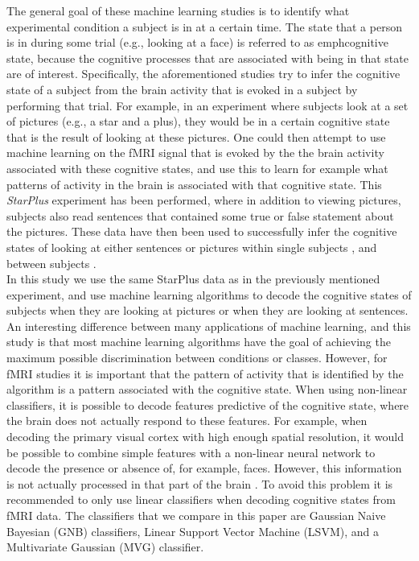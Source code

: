 \documentclass[preprint,journal,11pt]{vgtc}
\begin{document}
\indent  The general goal of these machine learning studies is to identify what experimental condition a subject is in at a certain time. The state that a person is in during some trial (e.g., looking at a face) is referred to as emph{cognitive state}, because the cognitive processes that are associated with being in that state are of interest. Specifically, the aforementioned studies try to infer the cognitive state of a subject from the brain activity that is evoked in a subject by performing that trial. For example, in an experiment where subjects look at a set of pictures (e.g., a star and a plus), they would be in a certain cognitive state that is the result of looking at these pictures. One could then attempt to use machine learning on the fMRI signal that is evoked by the the brain activity associated with these cognitive states, and use this to learn for example what patterns of activity in the brain is associated with that cognitive state. This \emph{StarPlus} experiment has been performed, where in addition to viewing pictures, subjects also read sentences that contained some true or false statement about the pictures. These data have then been used to successfully infer the cognitive states of looking at either sentences or pictures within single subjects \cite{mi:2003within}, and between subjects \cite{wa:2003betw}. \\
\indent In this study we use the same StarPlus data as in the previously mentioned experiment, and use machine learning algorithms to decode the cognitive states of subjects when they are looking at pictures or when they are looking at sentences. An interesting difference between many applications of machine learning, and this study is that most machine learning algorithms have the goal of achieving the maximum possible discrimination between conditions or classes. However, for fMRI studies it is important that the pattern of activity that is identified by the algorithm is a pattern associated with the cognitive state. When using non-linear classifiers, it is possible to decode features predictive of the cognitive state, where the brain does not actually respond to these features. For example, when decoding the primary visual cortex with high enough spatial resolution, it would be possible to combine simple features with a non-linear neural network to decode the presence or absence of, for example, faces. However, this information is not actually processed in that part of the brain \cite{to:2012rev}. To avoid this problem it is recommended to only use linear classifiers when decoding cognitive states from fMRI data. The classifiers that we compare in this paper are Gaussian Naive Bayesian (GNB) classifiers, Linear Support Vector Machine (LSVM), and a Multivariate Gaussian (MVG) classifier.\\
\end{document}
